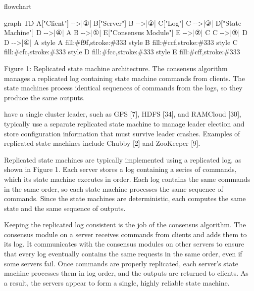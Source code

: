 \documentclass[
]{article}
\newenvironment{Shaded}{}{}
\newcommand{\NormalTok}[1]{#1}
\begin{document}
flowchart

\begin{Shaded}
\begin{Highlighting}[]
\NormalTok{graph TD}
\NormalTok{    A["Client"] {-}{-}\textgreater{}|①| B["Server"]}
\NormalTok{    B {-}{-}\textgreater{}|②| C["Log"]}
\NormalTok{    C {-}{-}\textgreater{}|③| D["State Machine"]}
\NormalTok{    D {-}{-}\textgreater{}|④| A}
\NormalTok{    B {-}{-}\textgreater{}|①| E["Consensus Module"]}
\NormalTok{    E {-}{-}\textgreater{}|②| C}
\NormalTok{    C {-}{-}\textgreater{}|③| D}
\NormalTok{    D {-}{-}\textgreater{}|④| A}
\NormalTok{    style A fill:\#f9f,stroke:\#333}
\NormalTok{    style B fill:\#ccf,stroke:\#333}
\NormalTok{    style C fill:\#cfc,stroke:\#333}
\NormalTok{    style D fill:\#fcc,stroke:\#333}
\NormalTok{    style E fill:\#cff,stroke:\#333}
\end{Highlighting}
\end{Shaded}

Figure 1: Replicated state machine architecture. The consensus algorithm
manages a replicated log containing state machine commands from clients.
The state machines process identical sequences of commands from the
logs, so they produce the same outputs.

have a single cluster leader, such as GFS {[}7{]}, HDFS {[}34{]}, and
RAMCloud {[}30{]}, typically use a separate replicated state machine to
manage leader election and store configuration information that must
survive leader crashes. Examples of replicated state machines include
Chubby {[}2{]} and ZooKeeper {[}9{]}.

Replicated state machines are typically implemented using a replicated
log, as shown in Figure 1. Each server stores a log containing a series
of commands, which its state machine executes in order. Each log
contains the same commands in the same order, so each state machine
processes the same sequence of commands. Since the state machines are
deterministic, each computes the same state and the same sequence of
outputs.

Keeping the replicated log consistent is the job of the consensus
algorithm. The consensus module on a server receives commands from
clients and adds them to its log. It communicates with the consensus
modules on other servers to ensure that every log eventually contains
the same requests in the same order, even if some servers fail. Once
commands are properly replicated, each server's state machine processes
them in log order, and the outputs are returned to clients. As a result,
the servers appear to form a single, highly reliable state machine.
\end{document}
